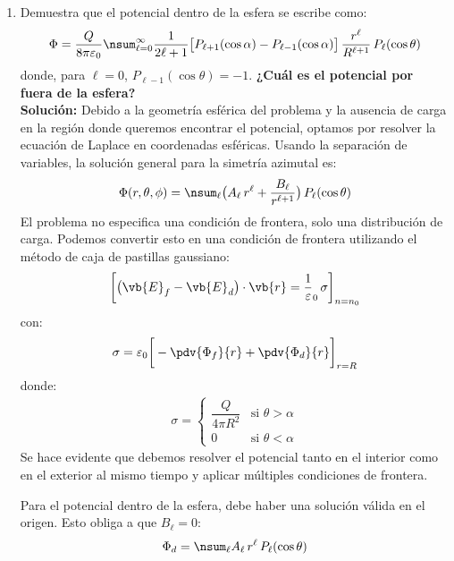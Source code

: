 \begin{enumerate}
\item Demuestra que el potencial dentro de la esfera se escribe como:
\begin{align*}
\Phi = \dfrac{Q}{8 \pi \varepsilon_{0}} \nsum_{\ell=0}^{\infty} \dfrac{1}{2 \ell + 1} \big[ P_{\ell+1} (\cos \alpha) - P_{\ell-1} (\cos \alpha) \big] \, \dfrac{r^{\ell}}{R^{\ell+1}} \, P_{\ell} (\cos \theta)
\end{align*}
donde, para $\ell = 0$, $P_{\ell-1} (\cos \theta) =  -1$. \textbf{¿Cuál es el potencial por fuera de la esfera?}
\\[1em]
\textbf{Solución: } Debido a la geometría esférica del problema y la ausencia de carga en la región donde queremos encontrar el potencial, optamos por resolver la ecuación de Laplace en coordenadas esféricas. Usando la separación de variables, la solución general para la simetría azimutal es:
\begin{align*}
\Phi (r, \theta, \phi) = \nsum_{\ell} \big( A_{\ell} \, r^{\ell} + \dfrac{B_{\ell}}{r^{\ell+1}} \big) \, P_\ell (\cos \theta)
\end{align*}
El problema no especifica una condición de frontera, solo una distribución de carga. Podemos convertir esto en una condición de frontera utilizando el método de caja de pastillas gaussiano:
\begin{align*}
\bigg[ \big( \vb{E}_{f} - \vb{E}_{d} \big) \cdot \vb{r} = \dfrac{1}{\varepsilon}_{0} \, \sigma \bigg]_{n=n_{0}}
\end{align*}
con:
\begin{align*}
\sigma = \varepsilon_{0} \bigg[ - \pdv{\Phi_{f}}{r} + \pdv{\Phi_{d}}{r} \bigg]_{r=R}
\end{align*}
donde:
\begin{align*}
\sigma = \begin{cases}
\dfrac{Q}{4 \pi R^{2}} & \mbox{si } \theta > \alpha \\
0 & \mbox{si } \theta < \alpha
\end{cases}
\end{align*}
Se hace evidente que debemos resolver el potencial tanto en el interior como en el exterior al mismo tiempo y aplicar múltiples condiciones de frontera.
\par
Para el potencial dentro de la esfera, debe haber una solución válida en el origen. Esto obliga a que $B_{\ell} = 0$:
\begin{align*}
\Phi_{d} = \nsum_{\ell} A_{\ell} \, r^{\ell} \, P_{\ell} (\cos \theta)
\end{align*}

\end{enumerate}
